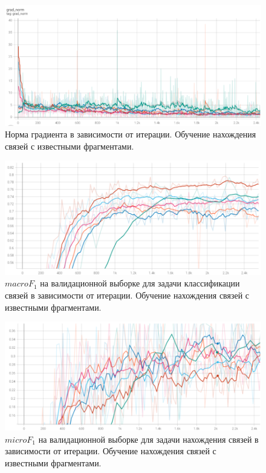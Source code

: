 \documentclass[12pt]{article}
\begin{document}
\begin{figure}[h]
    \centering
    \includegraphics[width=\textwidth]{images/grad_norm.png}
    \caption{Норма градиента в зависимости от итерации. Обучение нахождения связей с известными фрагментами.}
    \label{fig:grad_clf}
\end{figure}

\begin{figure}[h]
    \centering
    \includegraphics[width=\textwidth]{images/f_clf.png}
    \caption{$macro F_1$ на валидационной выборке для задачи классификации связей в зависимости от итерации. Обучение нахождения связей с известными фрагментами.}
    \label{fig:f_clf_rel_clf}
\end{figure}

\begin{figure}[h]
    \centering
    \includegraphics[width=\textwidth]{images/f_rel.png}
    \caption{$micro F_1$ на валидационной выборке для задачи нахождения связей в зависимости от итерации. Обучение нахождения связей с известными фрагментами.}
    \label{fig:f_rel_rel_clf}
\end{figure}
\end{document}
